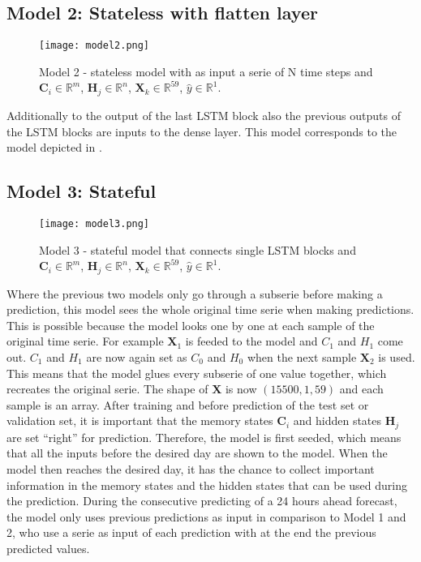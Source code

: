 \subsection{Model 2: Stateless with flatten layer}\label{s:Model2}

\begin{figure}[ht]
	\centering
	\texttt{[image: model2.png]}
	\caption{Model 2 - stateless model with as input a serie of N time steps and $ \bm{C}_{i} \in \mathbb{R}^{m} $, $ \bm{H}_{j} \in \mathbb{R}^{n} $, $ \bm{X}_{k} \in \mathbb{R}^{59} $, $ \hat{y} \in \mathbb{R}^{1} $.}
	\label{fig:model2}
\end{figure}

Additionally to the output of the last LSTM block also the previous outputs of the LSTM blocks are inputs to the dense layer. This model corresponds to the model depicted in \cite{Kong2019}.

\subsection{Model 3: Stateful}\label{s:Model3}
\begin{figure}[ht]
	\centering
	\texttt{[image: model3.png]}
	\caption{Model 3 - stateful model that connects single LSTM blocks and $ \bm{C}_{i} \in \mathbb{R}^{m} $, $ \bm{H}_{j} \in \mathbb{R}^{n} $, $ \bm{X}_{k} \in \mathbb{R}^{59} $, $ \hat{y} \in \mathbb{R}^{1} $.}
	\label{fig:model3}
\end{figure}

Where the previous two models only go through a subserie before making a prediction, this model sees the whole original time serie when making predictions. This is possible because the model looks one by one at each sample of the original time serie. For example $ \bm{X}_{1} $ is feeded to the model and $ C_{1} $ and $ H_{1} $ come out.  $ C_{1} $ and $ H_{1} $ are now again set as $ C_{0} $ and $ H_{0} $ when the next sample $ \bm{X}_{2}  $ is used. This means that the model glues every subserie of one value together, which recreates the original serie. The shape of $ \bm{X} $ is now $ (15500, 1, 59) $ and each sample is an array.  After training and before prediction of the test set or validation set, it is important that the memory states $ \bm{C}_{i} $  and hidden states $ \bm{H}_{j} $ are set ``right'' for prediction. Therefore, the model is first seeded, which means that all the inputs before the desired day are shown to the model. When the model then reaches the desired day, it has the chance to collect important information in the memory states and the hidden states that can be used during the prediction. During the consecutive predicting of a 24 hours ahead forecast, the model only uses previous predictions as input in comparison to Model 1 and 2, who use a serie as input of each prediction with at the end the previous predicted values.

